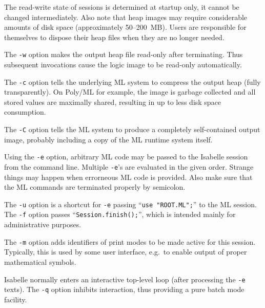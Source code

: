 \begin{isabellebody}
\begin{isamarkuptext}
  The read-write state of sessions is determined at startup only, it
  cannot be changed intermediately. Also note that heap images may
  require considerable amounts of disk space (approximately
  50--200~MB). Users are responsible for themselves to dispose their
  heap files when they are no longer needed.

  \medskip The \verb|-w| option makes the output heap file
  read-only after terminating.  Thus subsequent invocations cause the
  logic image to be read-only automatically.

  \medskip The \verb|-c| option tells the underlying ML system
  to compress the output heap (fully transparently).  On Poly/ML for
  example, the image is garbage collected and all stored values are
  maximally shared, resulting in up to  less disk space
  consumption.

  \medskip The \verb|-C| option tells the ML system to produce
  a completely self-contained output image, probably including a copy
  of the ML runtime system itself.

  \medskip Using the \verb|-e| option, arbitrary ML code may be
  passed to the Isabelle session from the command line. Multiple
  \verb|-e|'s are evaluated in the given order. Strange things
  may happen when errorneous ML code is provided. Also make sure that
  the ML commands are terminated properly by semicolon.

  \medskip The \verb|-u| option is a shortcut for \verb|-e| passing ``\verb|use "ROOT.ML";|'' to the ML session.
  The \verb|-f| option passes ``\verb|Session.finish();|'', which is intended mainly for administrative
  purposes.

  \medskip The \verb|-m| option adds identifiers of print modes
  to be made active for this session. Typically, this is used by some
  user interface, e.g.\ to enable output of proper mathematical
  symbols.

  \medskip Isabelle normally enters an interactive top-level loop
  (after processing the \verb|-e| texts). The \verb|-q|
  option inhibits interaction, thus providing a pure batch mode
  facility.


\end{isamarkuptext}
\end{isabellebody}
